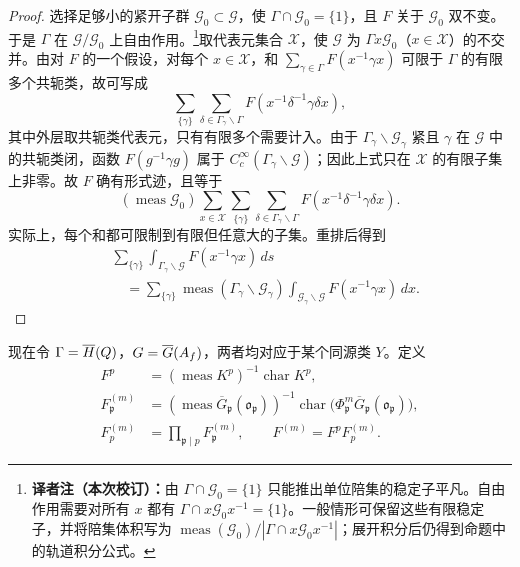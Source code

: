 \begin{proof}
选择足够小的紧开子群 $\mathcal G_0\subset\mathcal G$，使 $\Gamma\cap\mathcal G_0=\{1\}$，且 $F$ 关于 $\mathcal G_0$ 双不变。于是 $\Gamma$ 在 $\mathcal G/\mathcal G_0$ 上自由作用。\footnote{\textbf{译者注（本次校订）：}由 $\Gamma\cap\mathcal G_0=\{1\}$ 只能推出单位陪集的稳定子平凡。自由作用需要对所有 $x$ 都有 $\Gamma\cap x\mathcal G_0x^{-1}=\{1\}$。一般情形可保留这些有限稳定子，并将陪集体积写为 $\operatorname{meas}(\mathcal G_0)/|\Gamma\cap x\mathcal G_0x^{-1}|$；展开积分后仍得到命题中的轨道积分公式。}取代表元集合 $\mathcal X$，使 $\mathcal G$ 为 $\Gamma x\mathcal G_0$（$x\in\mathcal X$）的不交并。由对 $F$ 的一个假设，对每个 $x\in\mathcal X$，和 $\sum_{\gamma\in\Gamma}F(x^{-1}\gamma x)$ 可限于 $\Gamma$ 的有限多个共轭类，故可写成
\[
 \sum_{\{\gamma\}}\sum_{\delta\in\Gamma_\gamma\backslash\Gamma}
 F(x^{-1}\delta^{-1}\gamma\delta x),
\]
其中外层取共轭类代表元，只有有限多个需要计入。由于 $\Gamma_\gamma\backslash\mathcal G_\gamma$ 紧且 $\gamma$ 在 $\mathcal G$ 中的共轭类闭，函数 $F(g^{-1}\gamma g)$ 属于 $C_c^\infty(\Gamma_\gamma\backslash\mathcal G)$；因此上式只在 $\mathcal X$ 的有限子集上非零。故 $F$ 确有形式迹，且等于
\[
 (\operatorname{meas}\mathcal G_0)
 \sum_{x\in\mathcal X}\sum_{\{\gamma\}}
 \sum_{\delta\in\Gamma_\gamma\backslash\Gamma}
 F(x^{-1}\delta^{-1}\gamma\delta x).
\]
实际上，每个和都可限制到有限但任意大的子集。重排后得到
\[
 \begin{aligned}
 &\sum_{\{\gamma\}}\int_{\Gamma_\gamma\backslash\mathcal G}
 F(x^{-1}\gamma x)\,ds\\
 &\quad=\sum_{\{\gamma\}}\operatorname{meas}(\Gamma_\gamma\backslash\mathcal G_\gamma)
 \int_{\mathcal G_\gamma\backslash\mathcal G}F(x^{-1}\gamma x)\,dx.
 \end{aligned}
\]
\end{proof}

现在令 $\Gamma=\overline H(Q)$，$G=\overline G(A_f)$，两者均对应于某个同源类 $Y$。定义
\[
 \begin{aligned}
 F^p&=(\operatorname{meas}K^p)^{-1}\operatorname{char}K^p,\\
 F_\mathfrak p^{(m)}&=(\operatorname{meas}\overline G_\mathfrak p(\mathfrak o_\mathfrak p))^{-1}
 \operatorname{char}\bigl(\Phi_\mathfrak p^m\overline G_\mathfrak p(\mathfrak o_\mathfrak p)\bigr),\\
 F_p^{(m)}&=\prod_{\mathfrak p\mid p}F_\mathfrak p^{(m)},
 \qquad F^{(m)}=F^pF_p^{(m)}.
 \end{aligned}
\]

